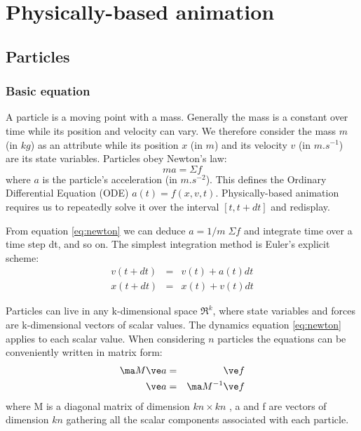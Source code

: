 \chapter{Physically-based animation} \label{chapter:pba}
\section{Particles} \label{sec:particles}
\subsection{Basic equation}
A particle is a moving point with a mass. Generally the mass is a constant over time while its position and velocity can vary. We therefore consider the mass $ m $ (in $ kg $) as an attribute while its position $ x $ (in $ m $) and its velocity $ v $ (in $m.s^{-1}$) are its state variables. 
Particles obey Newton's law: 
\begin{equation} \label{eq:newton}
ma = \Sigma f
\end{equation} 
where $a$ is the particle's acceleration (in $m.s^{-2}$). This defines the Ordinary Differential Equation (ODE) $a(t) = f(x,v,t)$. Physically-based animation requires us to repeatedly solve it over the interval $[t,t+dt]$ and redisplay.

From equation \ref{eq:newton} we can deduce $a=1/m\;\Sigma f$ and integrate time over a time step dt, and so on. The simplest integration method is Euler's explicit scheme:
\begin{eqnarray}
v(t+dt) &=& v(t)+a(t)dt \nonumber \\
x(t+dt) &=& x(t)+v(t)dt \label{eq:expliciteuler}
\end{eqnarray}

Particles can live in any k-dimensional space $\Re^k$, where state variables and forces are k-dimensional vectors of scalar values. The dynamics equation \ref{eq:newton} applies to each scalar value.
When considering $n$ particles the equations can be conveniently written in matrix form:
\begin{eqnarray*}
\ma M \ve a &=& \ve f\\
\ve a &=& \ma M^{-1} \ve f
\end{eqnarray*}
where \ma M is a diagonal matrix of dimension $kn\times kn$ , \ve a and \ve f are vectors of dimension $kn$ gathering all the scalar components associated with each particle.

